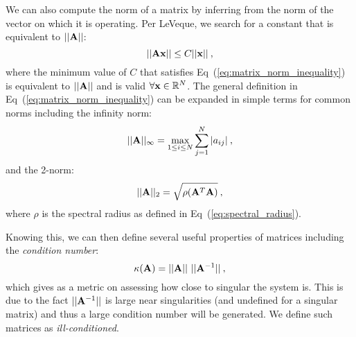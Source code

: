 We can also compute the norm of a matrix by inferring from the norm of
the vector on which it is operating. Per LeVeque, we search for a
constant that is equivalent to $||\mathbf{A}||$:
\begin{equation}
  ||\mathbf{A}\mathbf{x}|| \leq C ||\mathbf{x}||\:,
  \label{eq:matrix_norm_inequality}
\end{equation}
where the minimum value of $C$ that satisfies
Eq~(\ref{eq:matrix_norm_inequality}) is equivalent to $||\mathbf{A}||$
and is valid $\forall \mathbf{x} \in \mathbb{R}^N$. The general
definition in Eq~(\ref{eq:matrix_norm_inequality}) can be expanded in
simple terms for common norms including the infinity norm:
\begin{equation}
  ||\mathbf{A}||_{\infty} = \max_{1 \leq i \leq N} \sum^N_{j=1}|a_{ij}|\:,
  \label{eq:matrix_infinity_norm}
\end{equation}
and the 2-norm:
\begin{equation}
  ||\mathbf{A}||_{2} = \sqrt{\rho(\mathbf{A}^T\mathbf{A})}\:,
  \label{eq:matrix_2_norm}
\end{equation}
where $\rho$ is the spectral radius as defined in
Eq~(\ref{eq:spectral_radius}).

Knowing this, we can then define several useful properties of matrices
including the \textit{condition number}:
\begin{equation}
  \kappa(\mathbf{A}) = ||\mathbf{A}||\ ||\mathbf{A}^{-1}||\:,
  \label{eq:condition_number}
\end{equation}
which gives as a metric on assessing how close to singular the system
is. This is due to the fact $||\mathbf{A}^{-1}||$ is large near
singularities (and undefined for a singular matrix) and thus a large
condition number will be generated. We define such matrices as
\textit{ill-conditioned}. 

